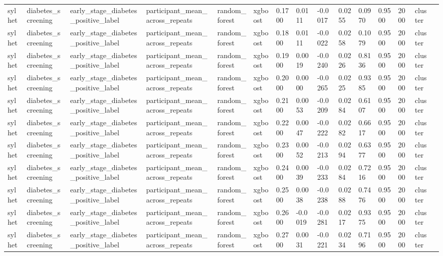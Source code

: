 \begin{tabular}{lllllllllllllll}
sylhet & diabetes\_screening & early\_stage\_diabetes\_positive\_label & participant\_mean\_across\_repeats & random\_forest & xgboost & 0.1700 & 0.0111 & -0.0017 & 0.0255 & 0.0970 & 0.9500 & 2000 & cluster &  \\
sylhet & diabetes\_screening & early\_stage\_diabetes\_positive\_label & participant\_mean\_across\_repeats & random\_forest & xgboost & 0.1800 & 0.0111 & -0.0022 & 0.0258 & 0.1079 & 0.9500 & 2000 & cluster &  \\
sylhet & diabetes\_screening & early\_stage\_diabetes\_positive\_label & participant\_mean\_across\_repeats & random\_forest & xgboost & 0.1900 & 0.0019 & -0.0240 & 0.0226 & 0.8136 & 0.9500 & 2000 & cluster &  \\
sylhet & diabetes\_screening & early\_stage\_diabetes\_positive\_label & participant\_mean\_across\_repeats & random\_forest & xgboost & 0.2000 & 0.0000 & -0.0265 & 0.0225 & 0.9385 & 0.9500 & 2000 & cluster &  \\
sylhet & diabetes\_screening & early\_stage\_diabetes\_positive\_label & participant\_mean\_across\_repeats & random\_forest & xgboost & 0.2100 & 0.0053 & -0.0209 & 0.0284 & 0.6107 & 0.9500 & 2000 & cluster &  \\
sylhet & diabetes\_screening & early\_stage\_diabetes\_positive\_label & participant\_mean\_across\_repeats & random\_forest & xgboost & 0.2200 & 0.0047 & -0.0222 & 0.0282 & 0.6617 & 0.9500 & 2000 & cluster &  \\
sylhet & diabetes\_screening & early\_stage\_diabetes\_positive\_label & participant\_mean\_across\_repeats & random\_forest & xgboost & 0.2300 & 0.0052 & -0.0213 & 0.0294 & 0.6377 & 0.9500 & 2000 & cluster &  \\
sylhet & diabetes\_screening & early\_stage\_diabetes\_positive\_label & participant\_mean\_across\_repeats & random\_forest & xgboost & 0.2400 & 0.0039 & -0.0233 & 0.0284 & 0.7216 & 0.9500 & 2000 & cluster &  \\
sylhet & diabetes\_screening & early\_stage\_diabetes\_positive\_label & participant\_mean\_across\_repeats & random\_forest & xgboost & 0.2500 & 0.0038 & -0.0238 & 0.0288 & 0.7476 & 0.9500 & 2000 & cluster &  \\
sylhet & diabetes\_screening & early\_stage\_diabetes\_positive\_label & participant\_mean\_across\_repeats & random\_forest & xgboost & 0.2600 & -0.0019 & -0.0281 & 0.0217 & 0.9375 & 0.9500 & 2000 & cluster &  \\
sylhet & diabetes\_screening & early\_stage\_diabetes\_positive\_label & participant\_mean\_across\_repeats & random\_forest & xgboost & 0.2700 & 0.0031 & -0.0221 & 0.0234 & 0.7196 & 0.9500 & 2000 & cluster &  \\

\end{tabular}
